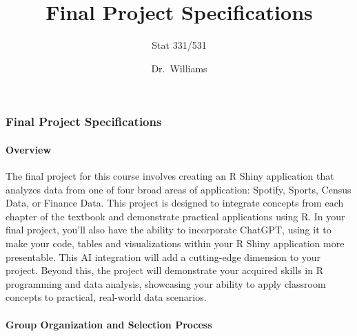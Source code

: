 \documentclass[
  letterpaper,
  DIV=11,
  numbers=noendperiod]{scrartcl}
\title{Final Project Specifications}
\subtitle{Stat 331/531}
\author{Dr.~Williams}
\date{}
\let\oldparagraph\paragraph
\renewcommand{\paragraph}[1]{\oldparagraph{#1}\mbox{}}
\begin{document}
\maketitle
\ifdefined\Shaded\renewenvironment{Shaded}{\begin{tcolorbox}[boxrule=0pt, breakable, enhanced, interior hidden, frame hidden, sharp corners, borderline west={3pt}{0pt}{shadecolor}]}{\end{tcolorbox}}\fi

\hypertarget{final-project-specifications}{%
\subsubsection{Final Project
Specifications}\label{final-project-specifications}}

\hypertarget{overview}{%
\paragraph{\texorpdfstring{\textbf{Overview}}{Overview}}\label{overview}}

The final project for this course involves creating an R Shiny
application that analyzes data from one of four broad areas of
application: Spotify, Sports, Census Data, or Finance Data. This project
is designed to integrate concepts from each chapter of the textbook and
demonstrate practical applications using R. In your final project,
you'll also have the ability to incorporate ChatGPT, using it to make
your code, tables and visualizations within your R Shiny application
more presentable. This AI integration will add a cutting-edge dimension
to your project. Beyond this, the project will demonstrate your acquired
skills in R programming and data analysis, showcasing your ability to
apply classroom concepts to practical, real-world data scenarios.

\hypertarget{group-organization-and-selection-process}{%
\paragraph{\texorpdfstring{\textbf{Group Organization and Selection
Process}}{Group Organization and Selection Process}}\label{group-organization-and-selection-process}}
\end{document}
